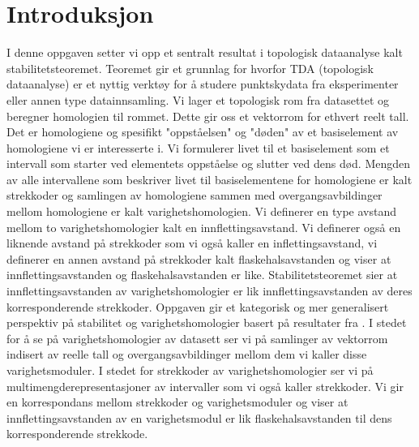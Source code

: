 \section{Introduksjon}

I denne oppgaven setter vi opp et sentralt resultat
i topologisk dataanalyse kalt stabilitetsteoremet.
Teoremet gir et grunnlag for hvorfor TDA (topologisk
dataanalyse) er et nyttig verktøy for å studere
punktskydata fra eksperimenter eller annen type
datainnsamling. Vi lager et topologisk rom fra datasettet
og beregner homologien til rommet. Dette gir oss et
vektorrom for ethvert reelt tall. Det er homologiene og
spesifikt "oppståelsen" og "døden" av et basiselement av
homologiene vi er interesserte i. Vi formulerer livet til
et basiselement som et intervall som starter ved
elementets oppståelse og slutter ved dens død. Mengden av
alle intervallene som beskriver livet til basiselementene
for homologiene er kalt strekkoder og samlingen av
homologiene sammen med overgangsavbildinger mellom
homologiene er kalt varighetshomologien.
Vi definerer en type avstand mellom to varighetshomologier
kalt en innflettingsavstand. Vi definerer også en liknende
avstand på strekkoder som vi også kaller en
inflettingsavstand, vi definerer en annen avstand på
strekkoder kalt flaskehalsavstanden og viser at
innflettingsavstanden og flaskehalsavstanden er like.
Stabilitetsteoremet sier at innflettingsavstanden av
varighetshomologier er lik innflettingsavstanden av deres
korresponderende strekkoder. Oppgaven gir et kategorisk og
mer generalisert perspektiv på stabilitet og
varighetshomologier basert på resultater fra \citep{Bauer2020}.
I stedet for å se på varighetshomologier av datasett ser
vi på samlinger av vektorrom indisert av reelle tall og
overgangsavbildinger mellom dem vi kaller disse
varighetsmoduler. I stedet for strekkoder av
varighetshomologier ser vi på multimengderepresentasjoner
av intervaller som vi også kaller strekkoder. Vi gir en
korrespondans mellom strekkoder og varighetsmoduler og
viser at innflettingsavstanden av en varighetsmodul er lik
flaskehalsavstanden til dens korresponderende strekkode.
